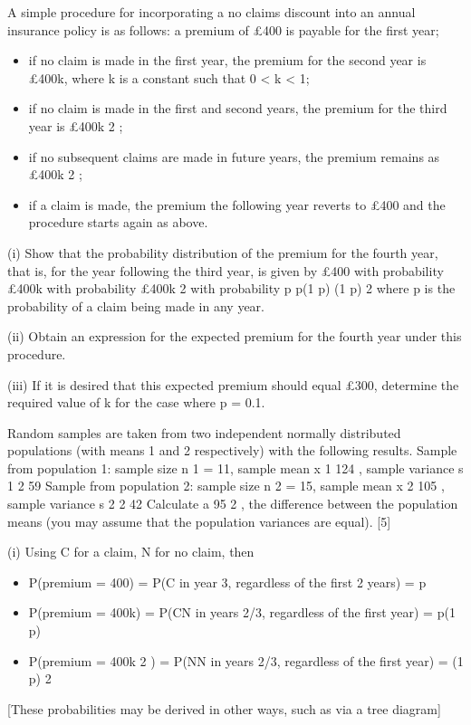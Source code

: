 \documentclass[a4paper,12pt]{article}
\begin{document}
\begin{enumerate}


A simple procedure for incorporating a no claims discount into an annual insurance policy is as follows:
a premium of £400 is payable for the first year;
\begin{itemize}
\item if no claim is made in the first year, the premium for the second year is £400k,
where k is a constant such that 0 < k < 1;
\item if no claim is made in the first and second years, the premium for the third
year is £400k 2 ;
\item if no subsequent claims are made in future years, the premium remains as
£400k 2 ;
\item if a claim is made, the premium the following year reverts to £400 and the
procedure starts again as above.
\end{itemize}
(i)
Show that the probability distribution of the premium for the fourth year, that is, for the year following the third year, is given by
£400
with probability
£400k with probability
£400k 2 with probability
p
p(1 p)
(1 p) 2
where p is the probability of a claim being made in any year.

(ii) Obtain an expression for the expected premium for the fourth year under this procedure.

(iii) If it is desired that this expected premium should equal £300, determine the required value of k for the case where p = 0.1.

Random samples are taken from two independent normally distributed populations
(with means 1 and 2 respectively) with the following results.
Sample from population 1:
sample size n 1 = 11, sample mean x 1 124 , sample variance s 1 2
59
Sample from population 2:
sample size n 2 = 15, sample mean x 2 105 , sample variance s 2 2
42
Calculate a 95%
2 , the difference between the
population means (you may assume that the population variances are equal).
[5]

(i) Using C for a claim, N for no claim, then
\begin{itemize}
\item P(premium = 400) = P(C in year 3, regardless of the first 2 years) = p
\item P(premium = 400k) = P(CN in years 2/3, regardless of the first year) = p(1 p)
\item P(premium = 400k 2 ) = P(NN in years 2/3, regardless of the first year) = (1 p) 2
\end{itemize}
[These probabilities may be derived in other ways, such as via a tree diagram]


\end{enumerate}
\end{document}
